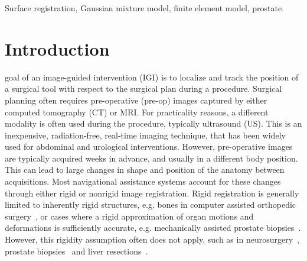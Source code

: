 \documentclass[journal]{IEEEtran}
\begin{document}
\begin{IEEEkeywords}
Surface registration, Gaussian mixture model, finite element model, prostate.
\end{IEEEkeywords}

\IEEEpeerreviewmaketitle
\section{Introduction} 
 goal of an image-guided intervention (IGI) is to localize and track the position of a surgical tool with respect to the surgical plan during a procedure. Surgical planning often requires pre-operative (pre-op) images captured by either computed tomography (CT) or MRI. For practicality reasons, a different modality is often used during the procedure, typically ultrasound (US).  This is an inexpensive, radiation-free, real-time imaging technique, that has been widely used for abdominal and urological interventions. However, pre-operative images are typically acquired weeks in advance, and usually in a different body position. This can lead to large changes in shape and position of the anatomy between acquisitions. Most navigational assistance systems account for these changes through either rigid or nonrigid image registration. Rigid registration is generally limited to inherently rigid structures, e.g. bones in computer assisted orthopedic surgery~\cite{Brounstein11a,Rasoulian12a}, or cases where a rigid approximation of organ motions and deformations is sufficiently accurate, e.g. mechanically assisted prostate biopsies~\cite{Silva13a}. However, this rigidity assumption often does not apply, such as in neurosurgery~\cite{Ferrant00a}, prostate biopsies~\cite{Baumann12a} and liver resections~\cite{Rucker14a}. 
\end{document}
